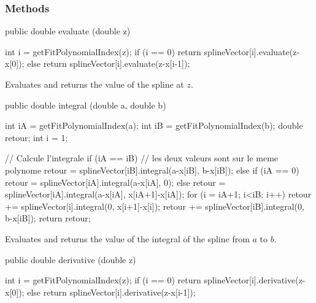 \subsubsection* {Methods}

\begin{code}

   public double evaluate (double z)\begin{hide} {
      int i = getFitPolynomialIndex(z);
      if (i == 0)
         return splineVector[i].evaluate(z-x[0]);
      else
         return splineVector[i].evaluate(z-x[i-1]);
   }\end{hide}
\end{code}
\begin{tabb} Evaluates and returns the value of the spline at $z$.
\end{tabb}
\begin{htmlonly}
\end{htmlonly}
\begin{code}

   public double integral (double a, double b)\begin{hide} {
      int iA = getFitPolynomialIndex(a);
      int iB = getFitPolynomialIndex(b);
      double retour;
      int i = 1;

      // Calcule l'integrale
      if (iA == iB) { // les deux valeurs sont sur le meme polynome
         retour = splineVector[iB].integral(a-x[iB], b-x[iB]);
      } else {
         if (iA == 0)
            retour = splineVector[iA].integral(a-x[iA], 0);
         else
            retour = splineVector[iA].integral(a-x[iA], x[iA+1]-x[iA]);
         for (i = iA+1; i<iB; i++) {
            retour += splineVector[i].integral(0, x[i+1]-x[i]);
         }
         retour += splineVector[iB].integral(0, b-x[iB]);
      }
      return retour;
   }\end{hide}
\end{code}
\begin{tabb}Evaluates and returns the value of the integral of the
 spline from $a$ to $b$.
\end{tabb}
\begin{htmlonly}
\end{htmlonly}
\begin{code}

   public double derivative (double z)\begin{hide} {
      int i = getFitPolynomialIndex(z);
      if (i == 0)
         return splineVector[i].derivative(z-x[0]);
      else
         return splineVector[i].derivative(z-x[i-1]);
   }\end{hide}
\end{code}
